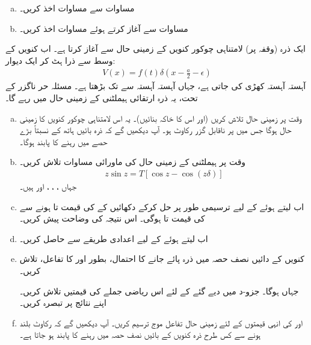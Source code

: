 \begin{enumerate}[a.]
\item
مساوات    سے مساوات  اخذ کریں۔
\item
مساوات    سے آغاز کرتے ہوئے مساوات     اخذ کریں۔
\end{enumerate}


ایک ذرہ     (وقفہ  پر) لامتناہی چوکور کنویں کے زمینی حال سے آغاز کرتا ہے۔ اب کنویں کے وسط  سے ذرا ہٹ کر   ایک دیوار:
\begin{align*}
V (x) = f (t) \delta (x - \frac{a}{2} - \epsilon)
\end{align*}
  آہستہ آہستہ کھڑی کی جاتی ہے، جہاں  آہستہ آہستہ سے  تک بڑھتا ہے۔  مسئلہ حر ناگزر کے تحت،  یہ ذرہ ارتقائی  ہیملٹنی کے زمینی حال میں  رہے گا۔ 
\begin{enumerate}[a.]
\item
وقت  پر زمینی حال تلاش کریں (اور اس  کا خاکہ بنائیں)۔   یہ اس لامتناہی چوکور کنویں کا زمینی حال ہوگا جس میں  پر ناقابل گزر رکاوٹ ہو۔ آپ دیکھیں گے کہ ذرہ بائیں ہاتھ کے نسبتاً بڑے  حصے  میں رہنے کا پابند ہوگا۔ 
\item
وقت  پر ہیملٹنی کے  زمینی حال کی ماورائی مساوات تلاش کریں۔  
\begin{align*}
z \sin z = T [\cos z - \cos (z \delta)]
\end{align*}
جہاں ،  ، ،  اور  ہیں۔ 
\item
اب  لیتے ہوئے  کے لیے ترسیمی طور پر حل کرکے دکھائیں کے  کی قیمت  تا   ہونے سے  کی قیمت  تا  ہوگی۔  اس نتیجہ کی وضاحت پیش کریں۔
\item 
اب  لیتے ہوئے   کے لیے اعدادی طریقے سے    حاصل کریں۔ 
\item
کنویں کے دائیں نصف حصہ میں ذرہ پائے جانے کا احتمال،  بطور  اور  کا تفاعل،  تلاش کریں۔ 

جہاں  ہوگا۔  جزو-د  میں دیے گئے   کے لئے اس ریاضی  جملے  کی قیمتیں تلاش کریں۔  اپنے نتائج پر تبصرہ کریں۔ 
\item
{} اور  کی انہی قیمتوں کے لئے زمینی حال تفاعل موج ترسیم کریں۔  آپ دیکھیں گے کہ رکاوٹ بلند ہونے سے کس طرح ذرہ کنویں کے بائیں نصف حصہ میں رہنے کا پابند ہو جاتا ہے۔ 
\end{enumerate}
